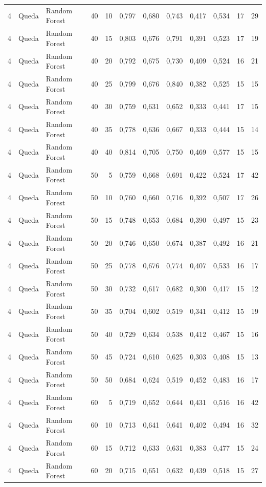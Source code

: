 \begin{longtable}{@{}rllrrrrrrrrr@{}}
4 & Queda & Random Forest & 40 & 10 & 0,797 & 0,680 & 0,743 & 0,417 & 0,534 & 17 & 29 \\
4 & Queda & Random Forest & 40 & 15 & 0,803 & 0,676 & 0,791 & 0,391 & 0,523 & 17 & 19 \\
4 & Queda & Random Forest & 40 & 20 & 0,792 & 0,675 & 0,730 & 0,409 & 0,524 & 16 & 21 \\
4 & Queda & Random Forest & 40 & 25 & 0,799 & 0,676 & 0,840 & 0,382 & 0,525 & 15 & 15 \\
4 & Queda & Random Forest & 40 & 30 & 0,759 & 0,631 & 0,652 & 0,333 & 0,441 & 17 & 15 \\
4 & Queda & Random Forest & 40 & 35 & 0,778 & 0,636 & 0,667 & 0,333 & 0,444 & 15 & 14 \\
4 & Queda & Random Forest & 40 & 40 & 0,814 & 0,705 & 0,750 & 0,469 & 0,577 & 15 & 15 \\
4 & Queda & Random Forest & 50 & 5 & 0,759 & 0,668 & 0,691 & 0,422 & 0,524 & 17 & 42 \\
4 & Queda & Random Forest & 50 & 10 & 0,760 & 0,660 & 0,716 & 0,392 & 0,507 & 17 & 26 \\
4 & Queda & Random Forest & 50 & 15 & 0,748 & 0,653 & 0,684 & 0,390 & 0,497 & 15 & 23 \\
4 & Queda & Random Forest & 50 & 20 & 0,746 & 0,650 & 0,674 & 0,387 & 0,492 & 16 & 21 \\
4 & Queda & Random Forest & 50 & 25 & 0,778 & 0,676 & 0,774 & 0,407 & 0,533 & 16 & 17 \\
4 & Queda & Random Forest & 50 & 30 & 0,732 & 0,617 & 0,682 & 0,300 & 0,417 & 15 & 12 \\
4 & Queda & Random Forest & 50 & 35 & 0,704 & 0,602 & 0,519 & 0,341 & 0,412 & 15 & 19 \\
4 & Queda & Random Forest & 50 & 40 & 0,729 & 0,634 & 0,538 & 0,412 & 0,467 & 15 & 16 \\
4 & Queda & Random Forest & 50 & 45 & 0,724 & 0,610 & 0,625 & 0,303 & 0,408 & 15 & 13 \\
4 & Queda & Random Forest & 50 & 50 & 0,684 & 0,624 & 0,519 & 0,452 & 0,483 & 16 & 17 \\
4 & Queda & Random Forest & 60 & 5 & 0,719 & 0,652 & 0,644 & 0,431 & 0,516 & 16 & 42 \\
4 & Queda & Random Forest & 60 & 10 & 0,713 & 0,641 & 0,641 & 0,402 & 0,494 & 16 & 32 \\
4 & Queda & Random Forest & 60 & 15 & 0,712 & 0,633 & 0,631 & 0,383 & 0,477 & 15 & 24 \\
4 & Queda & Random Forest & 60 & 20 & 0,715 & 0,651 & 0,632 & 0,439 & 0,518 & 15 & 27 \\

\end{longtable}
